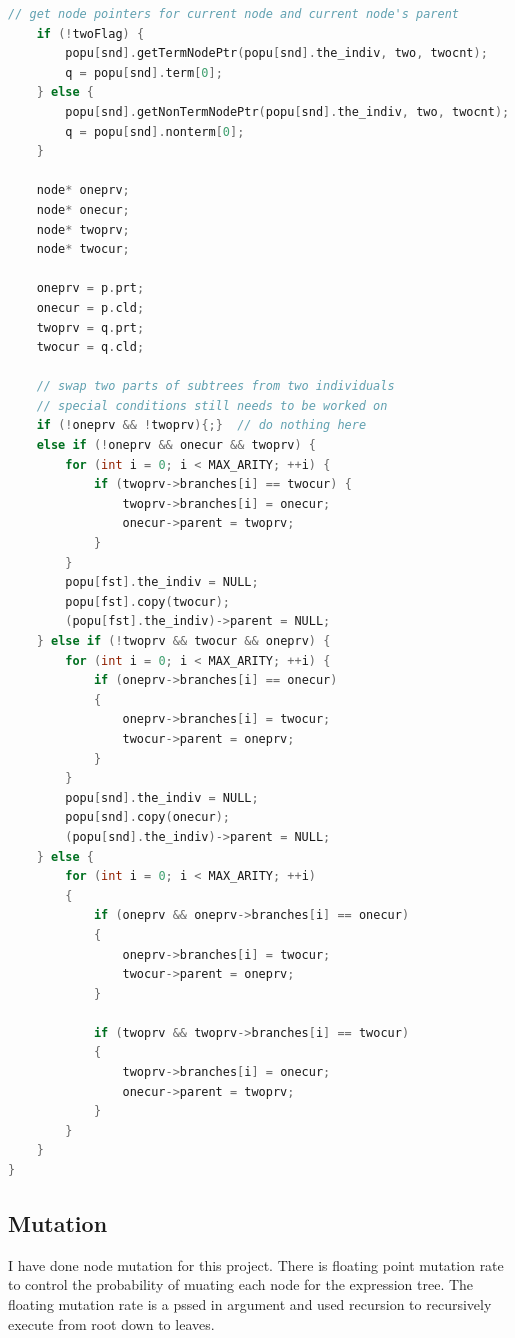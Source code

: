 \documentclass[10pt,b5paper]{article}
\begin{document}
\begin{lstlisting}[language=c++]
    // get node pointers for current node and current node's parent
    if (!twoFlag) {        
        popu[snd].getTermNodePtr(popu[snd].the_indiv, two, twocnt);
        q = popu[snd].term[0];
    } else {        
        popu[snd].getNonTermNodePtr(popu[snd].the_indiv, two, twocnt);
        q = popu[snd].nonterm[0];
    }

    node* oneprv;
    node* onecur;
    node* twoprv;
    node* twocur;
    
    oneprv = p.prt;
    onecur = p.cld;
    twoprv = q.prt;
    twocur = q.cld;

    // swap two parts of subtrees from two individuals
    // special conditions still needs to be worked on
    if (!oneprv && !twoprv){;}  // do nothing here
    else if (!oneprv && onecur && twoprv) {    
        for (int i = 0; i < MAX_ARITY; ++i) {        
            if (twoprv->branches[i] == twocur) {            
                twoprv->branches[i] = onecur;
                onecur->parent = twoprv;
            }
        }
        popu[fst].the_indiv = NULL;
        popu[fst].copy(twocur);
        (popu[fst].the_indiv)->parent = NULL;
    } else if (!twoprv && twocur && oneprv) {
        for (int i = 0; i < MAX_ARITY; ++i) {        
            if (oneprv->branches[i] == onecur) 
            {
                oneprv->branches[i] = twocur;
                twocur->parent = oneprv;
            }
        }
        popu[snd].the_indiv = NULL;
        popu[snd].copy(onecur);
        (popu[snd].the_indiv)->parent = NULL;
    } else {    
        for (int i = 0; i < MAX_ARITY; ++i) 
        {
            if (oneprv && oneprv->branches[i] == onecur) 
            {
                oneprv->branches[i] = twocur;
                twocur->parent = oneprv;
            }
        
            if (twoprv && twoprv->branches[i] == twocur)
            {
                twoprv->branches[i] = onecur;
                onecur->parent = twoprv;
            }
        }
    }
}
\end{lstlisting}
\subsection{Mutation}
\label{sec-1-3}
I have done node mutation for this project. There is floating point mutation rate to control the probability of muating each node for the expression tree. The floating mutation rate is a pssed in argument and used recursion to recursively execute from root down to leaves. 
\end{document}
